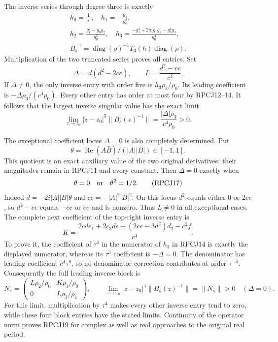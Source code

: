 The inverse series through degree three is exactly
\[
 \begin{gathered}
 h_0=\frac1{g_0},\quad h_1=-\frac{g_1}{g_0^2},\\
 h_2=\frac{g_1^2-g_0g_2}{g_0^3},\quad
 h_3=\frac{-g_1^3+2g_0g_1g_2-g_0^2g_3}{g_0^4},\\
 B_s^{-1}=\operatorname{diag}(\rho)^{-1}T_3(h)
                               \operatorname{diag}(\rho).
 \end{gathered}
 \tag{RPCJ14}
\]
Multiplication of the two truncated series proves all entries.
Set
\[
       \Delta=d(d^2-2ce),\qquad L=\frac{d^2-ce}{c^3}.
 \tag{RPCJ15}
\]
If $\Delta\ne0$, the only inverse entry with order five is
$h_3\rho_3/\rho_0$. Its leading coefficient is
$-\Delta\rho_3/(c^4\rho_0)$.
Every other entry has order at most four by RPCJ12--14.
It follows that the largest inverse singular value has the exact
limit
\[
 \lim_{z\to z_0}|z-z_0|^5\|B_s(z)^{-1}\|
               =\frac{|\Delta|\rho_3}{c^4\rho_0}>0.
 \tag{RPCJ16}
\]

The exceptional coefficient locus $\Delta=0$ is also completely
determined. Put
\[\theta=\operatorname{Re}(A\bar B)/(|A||B|)\in[-1,1].\]
This quotient is an exact auxiliary value of the two original
derivatives; their magnitudes remain in RPCJ11 and every constant.
Then $\Delta=0$ exactly when
\[
        \theta=0\quad\hbox{or}\quad\theta^2=1/2.
 \tag{RPCJ17}
\]
Indeed $d=-2i|A||B|\theta$ and $ce=-|A|^2|B|^2$.
On this locus $d^2$ equals either $0$ or $2ce$, so
$d^2-ce$ equals $-ce$ or $ce$ and is nonzero.
Thus $L\ne0$ in all exceptional cases.
The complete next coefficient of the top-right inverse entry is
\[
 K=\frac{2cde_1+2c_3de+(2ce-3d^2)d_2-c^2f}{c^4}.
 \tag{RPCJ18}
\]
To prove it, the coefficient of $\tau^4$ in the numerator of
$h_3$ in RPCJ14 is exactly the displayed numerator, whereas its
$\tau^3$ coefficient is $-\Delta=0$. The denominator has leading
coefficient $c^4\tau^8$, so no denominator correction contributes
at order $\tau^{-4}$. Consequently the full leading inverse block is
\[
 N_s=\begin{pmatrix}
 L\rho_2/\rho_0&K\rho_3/\rho_0\\
 0&L\rho_3/\rho_1
 \end{pmatrix},\qquad
 \lim_{z\to z_0}|z-z_0|^4\|B_s(z)^{-1}\|=\|N_s\|>0
                   \quad(\Delta=0).
 \tag{RPCJ19}
\]
For this limit, multiplication by $\tau^4$ makes every other inverse
entry tend to zero, while these four block entries have the stated
limits. Continuity of the operator norm proves RPCJ19 for complex
as well as real approaches to the original real period.

